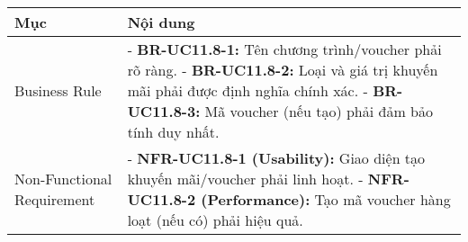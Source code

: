 \begin{longtable}{|m{4cm}|p{11cm}|}
\hline
\textbf{Mục} & \textbf{Nội dung} \\
\hline
Business Rule & - \textbf{BR-UC11.8-1:} Tên chương trình/voucher phải rõ ràng. \newline - \textbf{BR-UC11.8-2:} Loại và giá trị khuyến mãi phải được định nghĩa chính xác. \newline - \textbf{BR-UC11.8-3:} Mã voucher (nếu tạo) phải đảm bảo tính duy nhất. \\
\hline
Non-Functional Requirement & - \textbf{NFR-UC11.8-1 (Usability):} Giao diện tạo khuyến mãi/voucher phải linh hoạt. \newline - \textbf{NFR-UC11.8-2 (Performance):} Tạo mã voucher hàng loạt (nếu có) phải hiệu quả. \\
\hline
\end{longtable}

